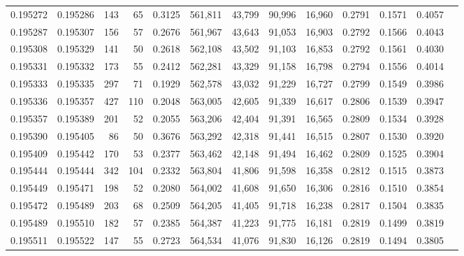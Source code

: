 \begin{tabular}{rrrrrrrrrrrrr}
0.195272 & 0.195286 &   143 &  65 &                                     0.3125 & 561,811 &  43,799 &  90,996 &  16,960 & 0.2791 & 0.1571 & 0.4057 \\
0.195287 & 0.195307 &   156 &  57 &                                     0.2676 & 561,967 &  43,643 &  91,053 &  16,903 & 0.2792 & 0.1566 & 0.4043 \\
0.195308 & 0.195329 &   141 &  50 &                                     0.2618 & 562,108 &  43,502 &  91,103 &  16,853 & 0.2792 & 0.1561 & 0.4030 \\
0.195331 & 0.195332 &   173 &  55 &                                     0.2412 & 562,281 &  43,329 &  91,158 &  16,798 & 0.2794 & 0.1556 & 0.4014 \\
0.195333 & 0.195335 &   297 &  71 &                                     0.1929 & 562,578 &  43,032 &  91,229 &  16,727 & 0.2799 & 0.1549 & 0.3986 \\
0.195336 & 0.195357 &   427 & 110 &                                     0.2048 & 563,005 &  42,605 &  91,339 &  16,617 & 0.2806 & 0.1539 & 0.3947 \\
0.195357 & 0.195389 &   201 &  52 &                                     0.2055 & 563,206 &  42,404 &  91,391 &  16,565 & 0.2809 & 0.1534 & 0.3928 \\
0.195390 & 0.195405 &    86 &  50 &                                     0.3676 & 563,292 &  42,318 &  91,441 &  16,515 & 0.2807 & 0.1530 & 0.3920 \\
0.195409 & 0.195442 &   170 &  53 &                                     0.2377 & 563,462 &  42,148 &  91,494 &  16,462 & 0.2809 & 0.1525 & 0.3904 \\
0.195444 & 0.195444 &   342 & 104 &                                     0.2332 & 563,804 &  41,806 &  91,598 &  16,358 & 0.2812 & 0.1515 & 0.3873 \\
0.195449 & 0.195471 &   198 &  52 &                                     0.2080 & 564,002 &  41,608 &  91,650 &  16,306 & 0.2816 & 0.1510 & 0.3854 \\
0.195472 & 0.195489 &   203 &  68 &                                     0.2509 & 564,205 &  41,405 &  91,718 &  16,238 & 0.2817 & 0.1504 & 0.3835 \\
0.195489 & 0.195510 &   182 &  57 &                                     0.2385 & 564,387 &  41,223 &  91,775 &  16,181 & 0.2819 & 0.1499 & 0.3819 \\
0.195511 & 0.195522 &   147 &  55 &                                     0.2723 & 564,534 &  41,076 &  91,830 &  16,126 & 0.2819 & 0.1494 & 0.3805 \\

\end{tabular}
